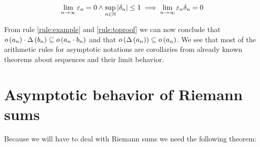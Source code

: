 \begin{align}
  \lim_{n\to\infty} \varepsilon_n = 0 \land \sup_{n\in\mathbb N} \left|{\delta_n}\right| \le 1 \implies \lim_{n\to\infty} \varepsilon_n \delta_n = 0
\end{align}

From rule \ref{rule:example} and \ref{rule:toproof} we can now conclude that $o\left( {a_n} \right) \cdot \Delta\left( {b_n} \right) \subseteq o\left( {a_n \cdot b_n} \right)$ and that $o\left( {\Delta\left( {a_n} \right)} \right) \subseteq o\left( {a_n} \right)$. We see that most of the arithmetic rules for asymptotic notations are corollaries from already known theorems about sequences and their limit behavior.

\section{Asymptotic behavior of Riemann sums}

Because we will have to deal with Riemann sums we need the following theorem:


